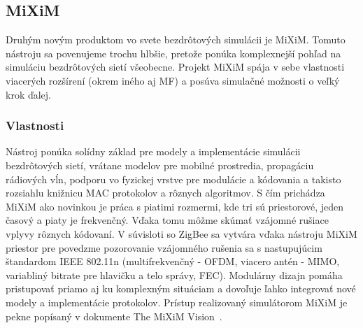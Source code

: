 \subsection{MiXiM}
\indent\indent Druhým novým produktom vo svete bezdrôtových simulácii je MiXiM. Tomuto nástroju sa povenujeme trochu hlbšie, pretože ponúka komplexnejší pohľad na simuláciu bezdrôtových sietí všeobecne. Projekt MiXiM spája v sebe vlastnosti viacerých rozšírení (okrem iného aj MF) a posúva simulačné možnosti o veľký krok ďalej.\\

\subsubsection{Vlastnosti}
\indent\indent Nástroj ponúka solídny základ pre modely a implementácie simulácii bezdrôtových sietí, vrátane modelov pre mobilné prostredia, propagáciu rádiových vĺn, podporu vo fyzickej vrstve pre modulácie a kódovania a takisto rozsiahlu knižnicu MAC protokolov a rôznych algoritmov. S čím prichádza MiXiM ako novinkou je práca s piatimi rozmermi, kde tri sú priestorové, jeden časový a piaty je frekvenčný. Vďaka tomu môžme skúmať vzájomné rušiace vplyvy rôznych kódovaní. V súvisloti so ZigBee sa vytvára vďaka nástroju MiXiM priestor pre povedzme pozorovanie vzájomného rušenia sa s nastupujúcim štandardom IEEE 802.11n (multifrekvenčný - OFDM, viacero antén - MIMO, variabliný bitrate pre hlavičku a telo správy, FEC). Modulárny dizajn pomáha pristupovať priamo aj ku komplexným situáciam a dovoľuje ľahko integrovať nové modely a implementácie protokolov. Prístup realizovaný simulátorom MiXiM je pekne popísaný v dokumente The MiXiM Vision~\cite{miximvision08}.\\


